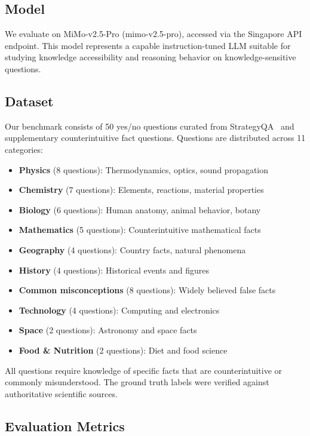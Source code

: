 \subsection{Model}
We evaluate on MiMo-v2.5-Pro (mimo-v2.5-pro), accessed via the Singapore API endpoint. This model represents a capable instruction-tuned LLM suitable for studying knowledge accessibility and reasoning behavior on knowledge-sensitive questions.

\subsection{Dataset}
Our benchmark consists of 50 yes/no questions curated from StrategyQA~\cite{geva2021strategyqa} and supplementary counterintuitive fact questions. Questions are distributed across 11 categories:

\begin{itemize}
\item \textbf{Physics} (8 questions): Thermodynamics, optics, sound propagation
\item \textbf{Chemistry} (7 questions): Elements, reactions, material properties
\item \textbf{Biology} (6 questions): Human anatomy, animal behavior, botany
\item \textbf{Mathematics} (5 questions): Counterintuitive mathematical facts
\item \textbf{Geography} (4 questions): Country facts, natural phenomena
\item \textbf{History} (4 questions): Historical events and figures
\item \textbf{Common misconceptions} (8 questions): Widely believed false facts
\item \textbf{Technology} (4 questions): Computing and electronics
\item \textbf{Space} (2 questions): Astronomy and space facts
\item \textbf{Food \& Nutrition} (2 questions): Diet and food science
\end{itemize}

All questions require knowledge of specific facts that are counterintuitive or commonly misunderstood. The ground truth labels were verified against authoritative scientific sources.

\subsection{Evaluation Metrics}

